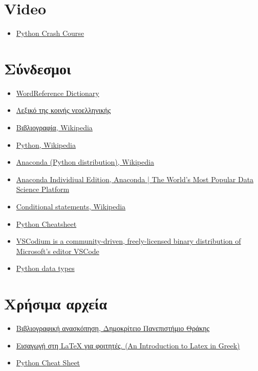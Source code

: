 \documentclass[12pt]{extreport}
\begin{document}
\section{Video}
\begin{itemize}
    \item \href{https://tinyurl.com/ya8wk4xm}{Python Crash Course}
\end{itemize}
\section{Σύνδεσμοι}
\begin{itemize}
    \item \href{https://tinyurl.com/yyzfa2bg}{WordReference Dictionary}
    \item \href{https://tinyurl.com/o5vxal7}{Λεξικό της κοινής νεοελληνικής}
    \item \href{https://tinyurl.com/y9q2elk4}{Βιβλιογραφία, Wikipedia}
    \item \href{https://tinyurl.com/y9g9nkh2}{Python, Wikipedia}
    \item \href{https://tinyurl.com/ycy6jsw5}{Anaconda (Python distribution),
              Wikipedia}
    \item \href{https://tinyurl.com/y7rogsec}{Anaconda Individiual Edition,
              Anaconda | The World's Most Popular Data Science Platform}
    \item \href{https://tinyurl.com/ogoqf2p}{Conditional statements, Wikipedia}
    \item \href{https://tinyurl.com/y8y59y44}{Python Cheatsheet}
    \item \href{https://tinyurl.com/y54gclet}{VSCodium is a community-driven,
              freely-licensed binary distribution of Microsoft’s editor VSCode}
    \item \href{https://www.tutorialsteacher.com/python/python-data-types}{Python data types}
\end{itemize}
\section{Χρήσιμα αρχεία}
\begin{itemize}
    \item \href{https://tinyurl.com/y9l8o5n6}{Βιβλιογραφική ανασκόπηση,
              Δημοκρίτειο Πανεπιστήμιο Θράκης}
    \item \href{https://tinyurl.com/yaaswz5p}{Εισαγωγή στη LaTeX για φοιτητές.
              (An Introduction to Latex in Greek)}
    \item \href{https://tinyurl.com/nqbrvss}{Python Cheat Sheet}
\end{itemize}
\end{document}
